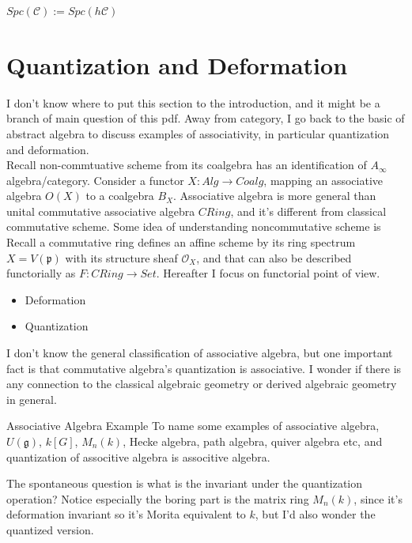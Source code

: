 \documentclass{article}
\begin{document}
$Spc(\mathcal{C}):= Spc(h\mathcal{C}) $


\section{Quantization and Deformation}

I don't know where to put this section to the introduction, and it might be a branch of main question of this pdf.
Away from category, I go back to the basic of abstract algebra to discuss examples of associativity, 
in particular quantization and deformation. \\

\noindent
Recall non-commtuative scheme from its coalgebra has an identification of $A_\infty$ algebra/category.
Consider a functor $X: Alg \to Coalg$, mapping an associative algebra $O(X)$ to a coalgebra $B_X$.
Associative algebra is more general than unital commutative associative algebra $CRing$, 
and it's different from classical commutative scheme. Some idea of understanding noncommutative scheme is \\

\noindent
Recall a commutative ring defines an affine scheme by its ring spectrum $X=V(\mathfrak{p})$ with its structure sheaf $\mathcal{O}_X$, 
and that can also be described functorially as $F: CRing \to Set$. Hereafter I focus on functorial point of view. \\


\begin{itemize}
\item Deformation
\item Quantization
\end{itemize}

I don't know the general classification of associative algebra,
but one important fact is that commutative algebra's quantization is associative.
I wonder if there is any connection to the classical algebraic geometry or derived algebraic geometry in general. \\

\begin{remark}{Associative Algebra Example}{}
To name some examples of associative algebra, $U(\mathfrak{g})$, $k[G]$, $M_n(k)$, Hecke algebra, path algebra, quiver algebra etc,
and quantization of associtive algebra is associtive algebra.
\end{remark}

\noindent 
The spontaneous question is what is the invariant under the quantization operation? 
Notice especially the boring part is the matrix ring $M_n(k)$, since it's deformation invariant so it's Morita equivalent to $k$,
but I'd also wonder the quantized version.
\end{document}
